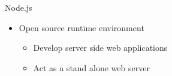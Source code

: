 \begin{frame}{Node.js}
  \begin{itemize}
    \item Open source runtime environment
    \begin{itemize}
      \item Develop server side web applications
      \item Act as a stand alone web server
    \end{itemize}

  \end{itemize}


\end{frame}
